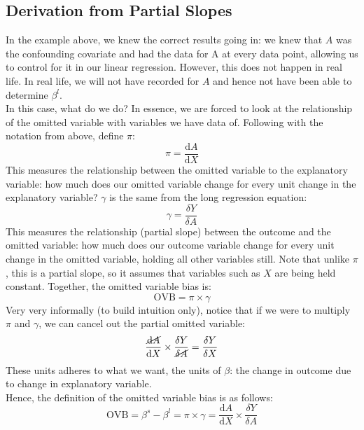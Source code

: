 \documentclass{article}
\begin{document}
\subsection{Derivation from Partial Slopes}
In the example above, we knew the correct results going in: we knew that $A$ was the confounding covariate and had the data for A at every data point, allowing us to control for it in our linear regression.
However, this does not happen in real life.
In real life, we will not have recorded for $A$ and hence not have been able to determine $\beta^l$.
\\
In this case, what do we do?
In essence, we are forced to look at the relationship of the omitted variable with variables we have data of.
Following with the notation from above, define $\pi$:
$$\pi = \frac{\text{d}A}{\text{d}X}$$
This measures the relationship between the omitted variable to the explanatory variable: how much does our omitted variable change for every unit change in the explanatory variable?
$\gamma$ is the same from the long regression equation:
$$\gamma = \frac{\delta Y}{\delta A}$$
This measures the relationship (partial slope) between the outcome and the omitted variable: how much does our outcome variable change for every unit change in the omitted variable, holding all other variables still.
Note that unlike $\pi$, this is a partial slope, so it assumes that variables such as $X$ are being held constant.
Together, the omitted variable bias is:
$$\text{OVB} = \pi \times \gamma $$
Very very informally (to build intuition only), notice that if we were to multiply $\pi$ and $\gamma$, we can cancel out the partial omitted variable:
$$\frac{\cancel{\text{d}A}}{\text{d}X} \times \frac{\delta Y}{\cancel{\delta A}} = \frac{\delta Y}{\delta X}$$
These units adheres to what we want, the units of $\beta$: the change in outcome due to change in explanatory variable. 
\\
Hence, the definition of the omitted variable bias is as follows:
$$\text{OVB} = \beta^s - \beta^l = \pi \times \gamma = \frac{\text{d}A}{\text{d}X} \times \frac{\delta Y}{\delta A}$$
\end{document}
